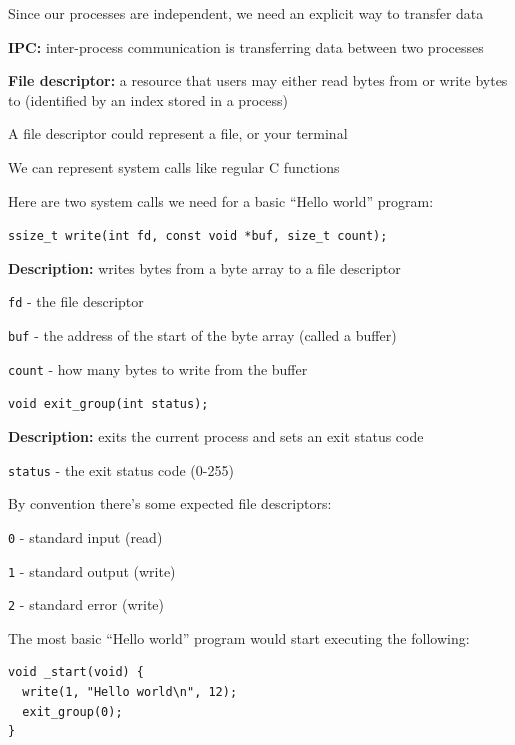 \begin{slide}
  

  Since our processes are independent, we need an explicit way to transfer data
  \medskip

  \textbf{IPC:} inter-process communication is transferring data between two
  processes
  \bigskip

  \textbf{File descriptor:} a resource that users may either read bytes from
  or write bytes to \newline
  (identified by an index stored in a process)
  \medskip

  A file descriptor could represent a file, or your terminal
\end{slide}

\begin{slide}
  

    We can represent system calls like regular C functions
    \medskip

    Here are two system calls we need for a basic ``Hello world'' program:
    \bigskip

    \texttt{ssize_t write(int fd, const void *buf, size_t count);}

    \textbf{Description:} writes bytes from a byte array to a file descriptor

    \leftspace{}\texttt{fd} - the file descriptor

    \leftspace{}\texttt{buf} - the address of the start of the byte
    array (called a buffer)

    \leftspace{}\texttt{count} - how many bytes to write from the
    buffer
    \bigskip

    \texttt{void exit_group(int status);}

    \textbf{Description:} exits the current process and sets an exit status code

    \leftspace{}\texttt{status} - the exit status code (0-255)
\end{slide}

\begin{slide}
  

  By convention there's some expected file descriptors:

  \leftspace{}\texttt{0} - standard input (read)

  \leftspace{}\texttt{1} - standard output (write)

  \leftspace{}\texttt{2} - standard error (write)
  \bigskip

  The most basic ``Hello world'' program would start executing the following:

  \begin{verbatim}
void _start(void) {
  write(1, "Hello world\n", 12);
  exit_group(0);
}
  \end{verbatim}

\end{slide}


